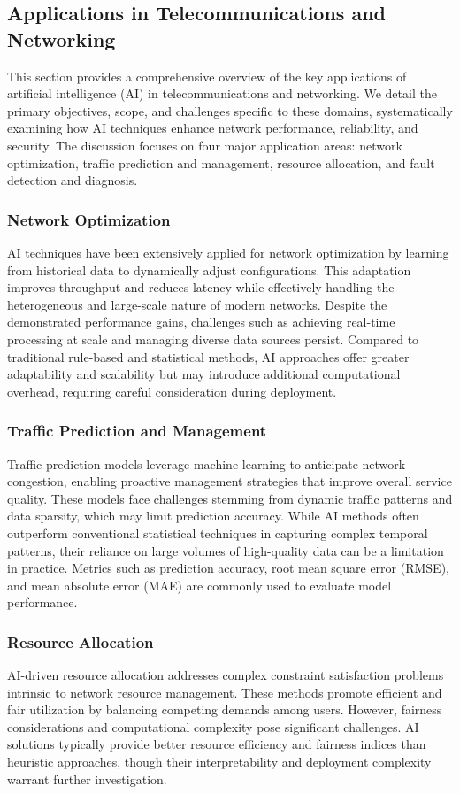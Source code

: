 \documentclass[sigconf]{acmart}
\begin{document}
\subsection{Applications in Telecommunications and Networking}

This section provides a comprehensive overview of the key applications of artificial intelligence (AI) in telecommunications and networking. We detail the primary objectives, scope, and challenges specific to these domains, systematically examining how AI techniques enhance network performance, reliability, and security. The discussion focuses on four major application areas: network optimization, traffic prediction and management, resource allocation, and fault detection and diagnosis.

\subsubsection{Network Optimization}
AI techniques have been extensively applied for network optimization by learning from historical data to dynamically adjust configurations. This adaptation improves throughput and reduces latency while effectively handling the heterogeneous and large-scale nature of modern networks. Despite the demonstrated performance gains, challenges such as achieving real-time processing at scale and managing diverse data sources persist. Compared to traditional rule-based and statistical methods, AI approaches offer greater adaptability and scalability but may introduce additional computational overhead, requiring careful consideration during deployment.

\subsubsection{Traffic Prediction and Management}
Traffic prediction models leverage machine learning to anticipate network congestion, enabling proactive management strategies that improve overall service quality. These models face challenges stemming from dynamic traffic patterns and data sparsity, which may limit prediction accuracy. While AI methods often outperform conventional statistical techniques in capturing complex temporal patterns, their reliance on large volumes of high-quality data can be a limitation in practice. Metrics such as prediction accuracy, root mean square error (RMSE), and mean absolute error (MAE) are commonly used to evaluate model performance.

\subsubsection{Resource Allocation}
AI-driven resource allocation addresses complex constraint satisfaction problems intrinsic to network resource management. These methods promote efficient and fair utilization by balancing competing demands among users. However, fairness considerations and computational complexity pose significant challenges. AI solutions typically provide better resource efficiency and fairness indices than heuristic approaches, though their interpretability and deployment complexity warrant further investigation.
\end{document}
